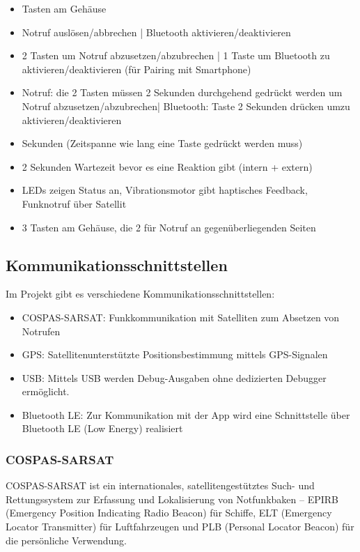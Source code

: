 \begin{itemize}
	\item Tasten am Gehäuse
	\item Notruf auslösen/abbrechen | Bluetooth aktivieren/deaktivieren
	\item 2 Tasten um Notruf abzusetzen/abzubrechen | 1 Taste um Bluetooth zu aktivieren/deaktivieren (für Pairing mit Smartphone) 
	\item  Notruf: die 2 Tasten müssen 2 Sekunden durchgehend gedrückt werden um Notruf abzusetzen/abzubrechen| Bluetooth: Taste 2 Sekunden drücken umzu aktivieren/deaktivieren 
	\item Sekunden (Zeitspanne wie lang eine Taste gedrückt werden muss) 
	\item  2 Sekunden Wartezeit bevor es eine Reaktion gibt (intern + extern) 
	\item  LEDs zeigen Status an, Vibrationsmotor gibt haptisches Feedback, Funknotruf über Satellit 
	\item  3 Tasten am Gehäuse, die 2 für Notruf an gegenüberliegenden Seiten 
\end{itemize}


\subsection{Kommunikationsschnittstellen}

Im Projekt gibt es verschiedene Kommunikationsschnittstellen:
\begin{itemize}
	\item COSPAS-SARSAT: Funkkommunikation mit Satelliten zum Absetzen von Notrufen
	\item GPS: Satellitenunterstützte Positionsbestimmung mittels GPS-Signalen
	\item USB: Mittels USB werden Debug-Ausgaben ohne dedizierten Debugger ermöglicht.
	\item Bluetooth LE: Zur Kommunikation mit der App wird eine Schnittstelle über Bluetooth LE (Low Energy) realisiert	
\end{itemize}

\subsubsection{COSPAS-SARSAT}

COSPAS-SARSAT ist ein internationales, satellitengestütztes Such- und Rettungssystem zur Erfassung und Lokalisierung von Notfunkbaken – EPIRB (Emergency Position Indicating Radio Beacon) für Schiffe, ELT (Emergency Locator Transmitter) für Luftfahrzeugen und PLB (Personal Locator Beacon) für die persönliche Verwendung.

